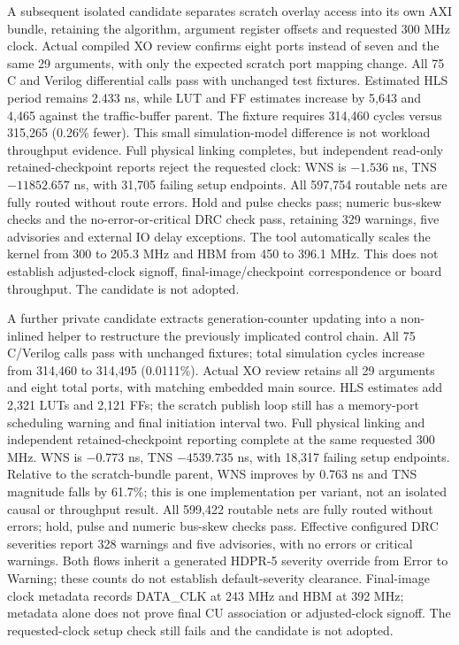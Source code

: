 \documentclass[10pt]{article}
\begin{document}
A subsequent isolated candidate separates scratch overlay access into its
own AXI bundle, retaining the algorithm, argument register offsets and
requested 300 MHz clock. Actual compiled XO review confirms eight ports
instead of seven and the same 29 arguments, with only the expected scratch
port mapping change. All 75 C and Verilog differential calls pass with
unchanged test fixtures. Estimated HLS period remains 2.433 ns, while LUT
and FF estimates increase by 5,643 and 4,465 against the traffic-buffer
parent. The fixture requires 314,460 cycles versus 315,265 (0.26\% fewer).
This small simulation-model difference is not workload throughput evidence.
Full physical linking completes, but independent read-only retained-checkpoint
reports reject the requested clock: WNS is $-1.536$ ns, TNS $-11852.657$ ns,
with 31,705 failing setup endpoints. All 597,754 routable nets are fully
routed without route errors. Hold and pulse checks pass; numeric bus-skew
checks and the no-error-or-critical DRC check pass, retaining 329 warnings,
five advisories and external IO delay exceptions. The tool automatically
scales the kernel from 300 to 205.3 MHz and HBM from 450 to 396.1 MHz.
This does not establish adjusted-clock signoff, final-image/checkpoint
correspondence or board throughput. The candidate is not adopted.

A further private candidate extracts generation-counter updating into a
non-inlined helper to restructure the previously implicated control chain.
All 75 C/Verilog calls pass with unchanged fixtures; total simulation cycles
increase from 314,460 to 314,495 (0.0111\%). Actual XO review retains all
29 arguments and eight total ports, with matching embedded main source.
HLS estimates add 2,321 LUTs and 2,121 FFs; the scratch publish loop still
has a memory-port scheduling warning and final initiation interval two.
Full physical linking and independent retained-checkpoint reporting complete
at the same requested 300 MHz. WNS is $-0.773$ ns, TNS $-4539.735$ ns,
with 18,317 failing setup endpoints. Relative to the scratch-bundle parent,
WNS improves by 0.763 ns and TNS magnitude falls by 61.7\%; this is one
implementation per variant, not an isolated causal or throughput result.
All 599,422 routable nets are fully routed without errors; hold, pulse
and numeric bus-skew checks pass. Effective configured DRC severities
report 328 warnings and five advisories, with no errors or critical
warnings. Both flows inherit a generated HDPR-5 severity override from
Error to Warning; these counts do not establish default-severity clearance.
Final-image clock metadata records DATA\_CLK at 243 MHz and HBM at 392 MHz;
metadata alone does not prove final CU association or adjusted-clock signoff.
The requested-clock setup check still fails and the candidate is not adopted.
\end{document}
